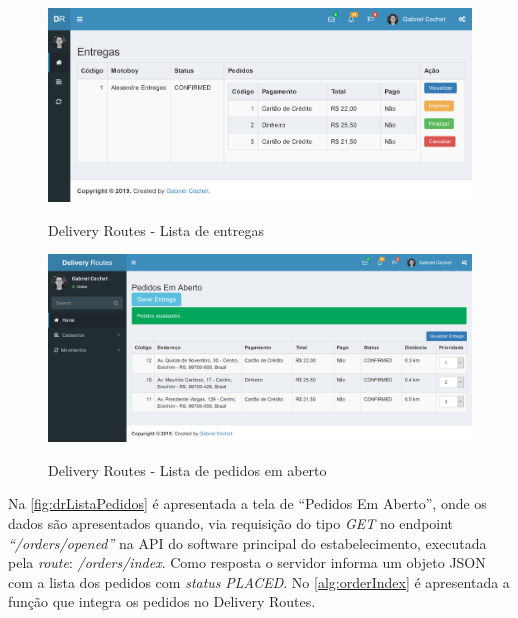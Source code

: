  \begin{figure}[H]
    \centering
    \caption{Delivery Routes - Lista de entregas}
    \includegraphics[width=1.0\textwidth]{./dados/figuras/fig26}
    \label{fig:drListaEntregas}
\end{figure}

 \begin{figure}[H]
    \centering
    \caption{Delivery Routes - Lista de pedidos em aberto}
    \includegraphics[width=1.0\textwidth]{./dados/figuras/fig29}
    \label{fig:drListaPedidos}
\end{figure}

\newpage
Na \autoref{fig:drListaPedidos} é apresentada a tela de “Pedidos Em Aberto”, onde os dados são apresentados quando, via requisição do tipo \textit{GET} no endpoint \textit{“/orders/opened”} na API do software principal do estabelecimento, executada pela \textit{route}: \textit{/orders/index}. Como resposta o servidor informa um objeto JSON com a lista dos pedidos com \textit{status} \textit{PLACED}. No \autoref{alg:orderIndex} é apresentada a função que integra os pedidos no Delivery Routes.

